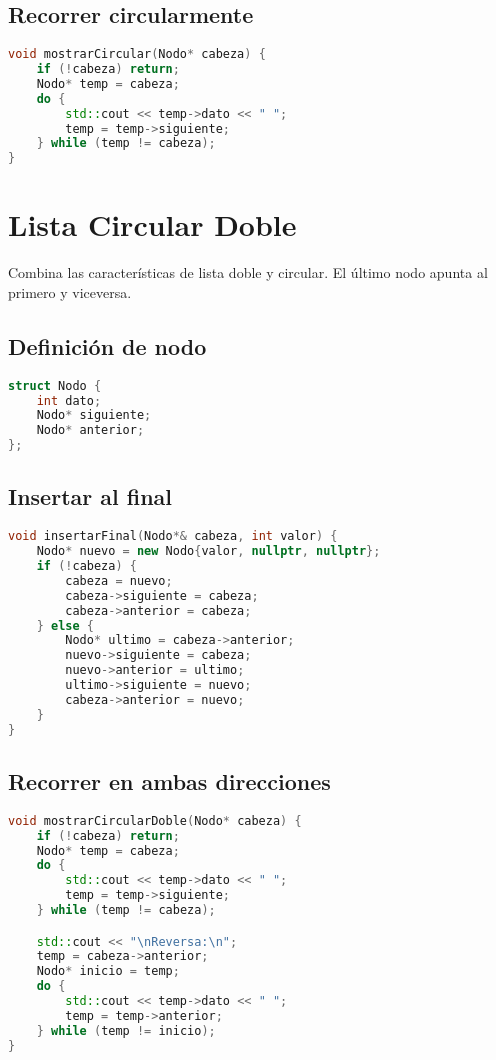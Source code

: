 \documentclass[a4paper]{article}
\begin{document}
\subsection*{Recorrer circularmente}

\begin{lstlisting}[language=C++]
void mostrarCircular(Nodo* cabeza) {
    if (!cabeza) return;
    Nodo* temp = cabeza;
    do {
        std::cout << temp->dato << " ";
        temp = temp->siguiente;
    } while (temp != cabeza);
}
\end{lstlisting}

\section{Lista Circular Doble}

Combina las características de lista doble y circular. El último nodo apunta al primero y viceversa.

\subsection*{Definición de nodo}

\begin{lstlisting}[language=C++]
struct Nodo {
    int dato;
    Nodo* siguiente;
    Nodo* anterior;
};
\end{lstlisting}

\subsection*{Insertar al final}

\begin{lstlisting}[language=C++]
void insertarFinal(Nodo*& cabeza, int valor) {
    Nodo* nuevo = new Nodo{valor, nullptr, nullptr};
    if (!cabeza) {
        cabeza = nuevo;
        cabeza->siguiente = cabeza;
        cabeza->anterior = cabeza;
    } else {
        Nodo* ultimo = cabeza->anterior;
        nuevo->siguiente = cabeza;
        nuevo->anterior = ultimo;
        ultimo->siguiente = nuevo;
        cabeza->anterior = nuevo;
    }
}
\end{lstlisting}

\subsection*{Recorrer en ambas direcciones}

\begin{lstlisting}[language=C++]
void mostrarCircularDoble(Nodo* cabeza) {
    if (!cabeza) return;
    Nodo* temp = cabeza;
    do {
        std::cout << temp->dato << " ";
        temp = temp->siguiente;
    } while (temp != cabeza);

    std::cout << "\nReversa:\n";
    temp = cabeza->anterior;
    Nodo* inicio = temp;
    do {
        std::cout << temp->dato << " ";
        temp = temp->anterior;
    } while (temp != inicio);
}
\end{lstlisting}
\newpage
\end{document}
